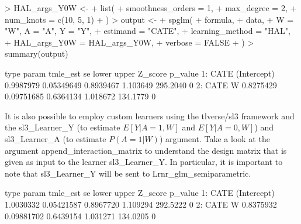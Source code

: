 \documentclass{article}
\begin{document}
\begin{Schunk}
\begin{Sinput}
> HAL_args_Y0W <-
+   list(
+     smoothness_orders = 1,
+     max_degree = 2,
+     num_knots = c(10, 5, 1)
+   )
> output <-
+   spglm(
+     formula,
+     data,
+     W = "W", A = "A", Y = "Y",
+     estimand = "CATE",
+     learning_method = "HAL",
+     HAL_args_Y0W = HAL_args_Y0W,
+     verbose = FALSE
+   )
> summary(output) 
\end{Sinput}
\begin{Soutput}
   type       param  tmle_est         se     lower    upper  Z_score p_value
1: CATE (Intercept) 0.9987979 0.05349649 0.8939467 1.103649 295.2040       0
2: CATE           W 0.8275429 0.09751685 0.6364134 1.018672 134.1779       0
\end{Soutput}
\end{Schunk}

It is also possible to employ custom learners using the tlverse/sl3 framework and the sl3\_Learner\_Y (to estimate $E[Y|A=1,W]$ and $E[Y|A=0,W]$) and sl3\_Learner\_A (to estimate $P(A=1|W)$) argument.
Take a look at the argument append\_interaction\_matrix to understand the design matrix that is given as input to the learner sl3\_Learner\_Y. In particular, it is important to note that sl3\_Learner\_Y will be sent to Lrnr\_glm\_semiparametric.

\begin{Schunk}
\begin{Soutput}
   type       param  tmle_est         se     lower    upper  Z_score p_value
1: CATE (Intercept) 1.0030332 0.05421587 0.8967720 1.109294 292.5222       0
2: CATE           W 0.8375932 0.09881702 0.6439154 1.031271 134.0205       0
\end{Soutput}
\end{Schunk}
\end{document}
